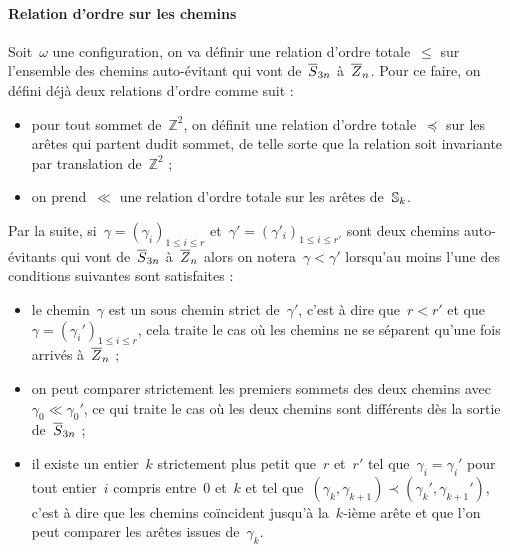 		\paragraph{Relation d'ordre sur les chemins}
			Soit~$\omega$ une configuration, on va définir une relation d'ordre totale~$\leq$ sur l'ensemble des chemins auto-évitant qui vont de~$\overline{S}_{3n}$ à~$\overline{Z}_{n}$. Pour ce faire, on défini déjà deux relations d'ordre comme suit :
			\begin{itemize}
				\item pour tout sommet de~$\mathbb{Z}^2$, on définit une relation d'ordre totale~$\preceq$ \marginnote{$\preceq$} sur les arêtes qui partent dudit sommet, de telle sorte que la relation soit invariante par translation de~$\mathbb{Z}^2$ ;
				\item on prend~$\ll$ \marginnote{$\ll$} une relation d'ordre totale sur les arêtes de~$\mathbb{S}_k$.
			\end{itemize}
			Par la suite, si~$\gamma = \left(\gamma_i\right)_{1\leq i\leq r}$ et~$\gamma'=\left(\gamma'_i\right)_{1\leq i\leq r'}$ sont deux chemins auto-évitants qui vont de~$\overline{S}_{3n}$ à~$\overline{Z}_{n}$ alors on notera~$\gamma <\gamma'$ \marginnote{$\leq$} lorsqu'au moins l'une des conditions suivantes sont satisfaites :
			\begin{itemize}
				\item le chemin~$\gamma$ est un sous chemin strict de~$\gamma'$, c'est à dire que~$r<r'$ et que~$\gamma = \left(\gamma_i'\right)_{1\leq i\leq r}$, cela traite le cas où les chemins ne se séparent qu'une fois arrivés à~$\overline{Z}_{n}$ ;
				\item on peut comparer strictement les premiers sommets des deux chemins avec~$\gamma_0 \ll \gamma_0'$, ce qui traite le cas où les deux chemins sont différents dès la sortie de~$\overline{S}_{3n}$ ;
				\item il existe un entier~$k$ strictement plus petit que~$r$ et~$r'$ tel que~$\gamma_i=\gamma_i'$ pour tout entier~$i$ compris entre~$0$ et~$k$ et tel que~$(\gamma_k,\gamma_{k+1}) \prec (\gamma_k',\gamma_{k+1}')$, c'est à dire que les chemins coïncident jusqu'à la~$k$-ième arête et que l'on peut comparer les arêtes issues de~$\gamma_k$.
		\end{itemize}
